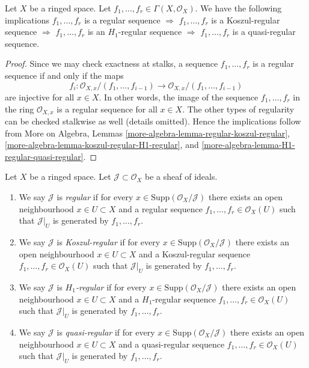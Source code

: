 \begin{lemma}
\label{lemma-types-regular-sequences-implications}
Let $X$ be a ringed space.
Let $f_1, \ldots, f_r \in \Gamma(X, \mathcal{O}_X)$.
We have the following implications
$f_1, \ldots, f_r$ is a regular sequence $\Rightarrow$
$f_1, \ldots, f_r$ is a Koszul-regular sequence $\Rightarrow$
$f_1, \ldots, f_r$ is an $H_1$-regular sequence $\Rightarrow$
$f_1, \ldots, f_r$ is a quasi-regular sequence.
\end{lemma}

\begin{proof}
Since we may check exactness at stalks, a
sequence $f_1, \ldots, f_r$ is a regular sequence if and only
if the maps
$$
f_i :
\mathcal{O}_{X, x}/(f_1, \ldots, f_{i - 1})
\longrightarrow
\mathcal{O}_{X, x}/(f_1, \ldots, f_{i - 1})
$$
are injective for all $x \in X$. In other words, the image of the sequence
$f_1, \ldots, f_r$ in the ring $\mathcal{O}_{X, x}$ is a
regular sequence for all $x \in X$. The other types of regularity
can be checked stalkwise as well (details omitted).
Hence the implications follow from
More on Algebra, Lemmas
\ref{more-algebra-lemma-regular-koszul-regular},
\ref{more-algebra-lemma-koszul-regular-H1-regular}, and
\ref{more-algebra-lemma-H1-regular-quasi-regular}.
\end{proof}

\begin{definition}
\label{definition-regular-ideal-sheaf}
Let $X$ be a ringed space. Let $\mathcal{J} \subset \mathcal{O}_X$
be a sheaf of ideals.
\begin{enumerate}
\item We say $\mathcal{J}$ is {\it regular} if for every
$x \in \text{Supp}(\mathcal{O}_X/\mathcal{J})$ there exists an open
neighbourhood $x \in U \subset X$ and a regular sequence
$f_1, \ldots, f_r \in \mathcal{O}_X(U)$ such that $\mathcal{J}|_U$
is generated by $f_1, \ldots, f_r$.
\item We say $\mathcal{J}$ is {\it Koszul-regular} if for every
$x \in \text{Supp}(\mathcal{O}_X/\mathcal{J})$ there exists an open
neighbourhood $x \in U \subset X$ and a Koszul-regular sequence
$f_1, \ldots, f_r \in \mathcal{O}_X(U)$ such that $\mathcal{J}|_U$
is generated by $f_1, \ldots, f_r$.
\item We say $\mathcal{J}$ is {\it $H_1$-regular} if for every
$x \in \text{Supp}(\mathcal{O}_X/\mathcal{J})$ there exists an open
neighbourhood $x \in U \subset X$ and a $H_1$-regular sequence
$f_1, \ldots, f_r \in \mathcal{O}_X(U)$ such that $\mathcal{J}|_U$
is generated by $f_1, \ldots, f_r$.
\item We say $\mathcal{J}$ is {\it quasi-regular} if for every
$x \in \text{Supp}(\mathcal{O}_X/\mathcal{J})$ there exists an open
neighbourhood $x \in U \subset X$ and a quasi-regular sequence
$f_1, \ldots, f_r \in \mathcal{O}_X(U)$ such that $\mathcal{J}|_U$
is generated by $f_1, \ldots, f_r$.
\end{enumerate}
\end{definition}


